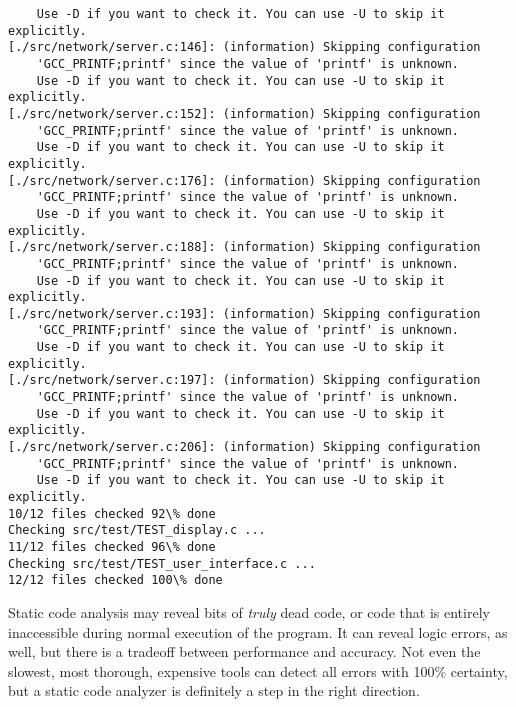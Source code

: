 \documentclass[letterpaper]{article}
\begin{document}
\begin{lstlisting}
    Use -D if you want to check it. You can use -U to skip it explicitly.
[./src/network/server.c:146]: (information) Skipping configuration
    'GCC_PRINTF;printf' since the value of 'printf' is unknown.
    Use -D if you want to check it. You can use -U to skip it explicitly.
[./src/network/server.c:152]: (information) Skipping configuration
    'GCC_PRINTF;printf' since the value of 'printf' is unknown.
    Use -D if you want to check it. You can use -U to skip it explicitly.
[./src/network/server.c:176]: (information) Skipping configuration
    'GCC_PRINTF;printf' since the value of 'printf' is unknown.
    Use -D if you want to check it. You can use -U to skip it explicitly.
[./src/network/server.c:188]: (information) Skipping configuration
    'GCC_PRINTF;printf' since the value of 'printf' is unknown.
    Use -D if you want to check it. You can use -U to skip it explicitly.
[./src/network/server.c:193]: (information) Skipping configuration
    'GCC_PRINTF;printf' since the value of 'printf' is unknown.
    Use -D if you want to check it. You can use -U to skip it explicitly.
[./src/network/server.c:197]: (information) Skipping configuration
    'GCC_PRINTF;printf' since the value of 'printf' is unknown.
    Use -D if you want to check it. You can use -U to skip it explicitly.
[./src/network/server.c:206]: (information) Skipping configuration
    'GCC_PRINTF;printf' since the value of 'printf' is unknown.
    Use -D if you want to check it. You can use -U to skip it explicitly.
10/12 files checked 92\% done
Checking src/test/TEST_display.c ...
11/12 files checked 96\% done
Checking src/test/TEST_user_interface.c ...
12/12 files checked 100\% done
\end{lstlisting}

Static code analysis may reveal bits of \emph{truly} dead code,
or code that is entirely inaccessible during normal execution of
the program. It can reveal logic errors, as well, but there is a
tradeoff between performance and accuracy. Not even the slowest,
most thorough, expensive tools can detect all errors with 100\%
certainty, but a static code analyzer is definitely a step in
the right direction.

\end{document}
